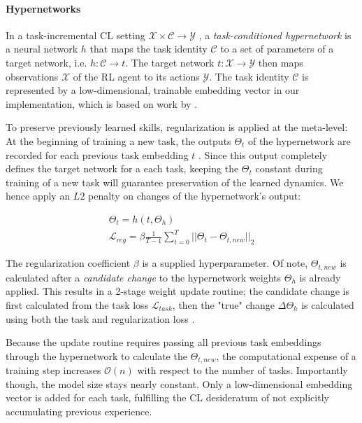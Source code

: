 \documentclass[dvipsnames]{article} %
\newcommand{\comment}[1]{}
\newcommand{\jh}[1] {\comment{{\color{RawSienna} JH: #1}}}           %
\begin{document}
\paragraph{Hypernetworks}
In a task-incremental CL setting $\mathcal{X}\times\mathcal{C}\rightarrow\mathcal{Y}$ \citep{threescenarios}, a \textit{task-conditioned hypernetwork} is a neural network $h$ that maps the task identity $\mathcal{C}$ to a set of parameters of a target network, i.e. $h:\mathcal{C}\rightarrow t$. The target network $t:\mathcal{X}\rightarrow\mathcal{Y}$ then maps observations $\mathcal{X}$ of the RL agent to its actions $\mathcal{Y}$. The task identity $\mathcal{C}$ is represented by a low-dimensional, trainable embedding vector in our implementation, which is based on work by \citet{auddyHollensteinClfd}.

To preserve previously learned skills, regularization is applied at the meta-level: At the beginning of training a new task, the outputs $\Theta_t$ of the hypernetwork are recorded for each previous task embedding $t$ \citep{CLHypernetworks}. Since this output completely defines the target network for a each task, keeping the $\Theta_t$ constant during training of a new task will guarantee preservation of the learned dynamics. We hence apply an $L2$ penalty on changes of the hypernetwork's output:

\begin{gather}
    \Theta_t=h(t, \Theta_h) \\
    \mathcal{L}_{reg} = \beta\frac{1}{T-1}\sum^T_{t=0} ||\Theta_t - \Theta_{t,new}||_2 \label{regloss}
\end{gather}

The regularization coefficient $\beta$ is a supplied hyperparameter. Of note, $\Theta_{t,new}$ is calculated after a \textit{candidate change} to the hypernetwork weights $\Theta_h$ is already applied. This results in a 2-stage weight update routine; the candidate change is first calculated from the task loss $\mathcal{L}_{task}$, then the "true" change $\Delta\Theta_h$ is calculated using both the task and regularization loss \citep{CLHypernetworks}. 

Because the update routine requires passing all previous task embeddings through the hypernetwork to calculate the $\Theta_{t,new}$, the computational expense of a training step increases $\mathcal{O}(n)$ with respect to the number of tasks. Importantly though, the model size stays nearly constant\jh{nearly constant is a bit contradictory, no? Maybe you can be more specific by how much it grows.}. Only a low-dimensional embedding vector is added for each task, fulfilling the CL desideratum of not explicitly accumulating previous experience.
\end{document}
